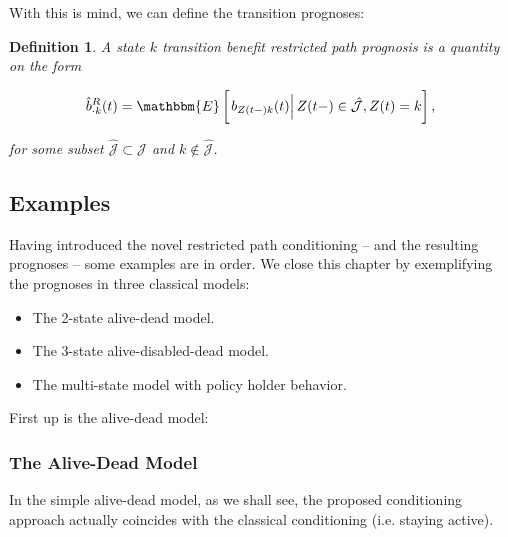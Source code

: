 \documentclass{article}
\newcommand{\1}[1]{\mathbbm{1}_{\left\lbrace #1 \right\rbrace}}
\newcommand{\econd}[2][def]{\mathbbm{E} \left[ \left. #1 \right| #2 \right]}
\theoremstyle{break}
\newtheorem{definition}{Definition}[section]
\theoremstyle{remark}
\numberwithin{equation}{section}
\begin{document}
With this is mind, we can define the transition prognoses:

\begin{definition} \label{DefTraRestr}
	A state $k$ transition benefit restricted path prognosis is a quantity on the form
	
	\begin{gather*}
		\hat{b}_{\cdot k}^R(t) = \econd[b_{Z(t-)k}(t)]{Z(t-) \in \hat{\mathcal{J}}, Z(t)=k},
	\end{gather*}
	
	for some subset $\hat{\mathcal{J}} \subset \mathcal{J}$ and $k \notin \hat{\mathcal{J}}$.
\end{definition}

\newpage

\subsection{Examples}

Having introduced the novel restricted path conditioning -- and the resulting prognoses -- some examples are in order. We close this chapter by exemplifying the prognoses in three classical models:

\begin{itemize}
	\item The 2-state alive-dead model.
	\item The 3-state alive-disabled-dead model.
	\item The multi-state model with policy holder behavior.
\end{itemize}

First up is the alive-dead model:

\subsubsection{The Alive-Dead Model} \label{ExampleOne}
In the simple alive-dead model, as we shall see, the proposed conditioning approach actually coincides with the classical conditioning (i.e. staying active).
\end{document}
